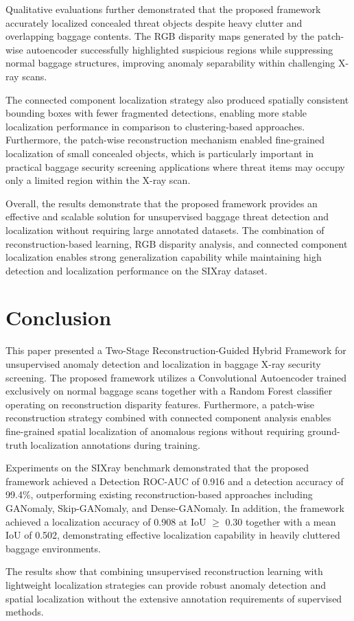 \documentclass{bmvc2k}
\begin{document}
Qualitative evaluations further demonstrated that the proposed framework accurately localized concealed threat objects despite heavy clutter and overlapping baggage contents. The RGB disparity maps generated by the patch-wise autoencoder successfully highlighted suspicious regions while suppressing normal baggage structures, improving anomaly separability within challenging X-ray scans.

The connected component localization strategy also produced spatially consistent bounding boxes with fewer fragmented detections, enabling more stable localization performance in comparison to clustering-based approaches. Furthermore, the patch-wise reconstruction mechanism enabled fine-grained localization of small concealed objects, which is particularly important in practical baggage security screening applications where threat items may occupy only a limited region within the X-ray scan.

Overall, the results demonstrate that the proposed framework provides an effective and scalable solution for unsupervised baggage threat detection and localization without requiring large annotated datasets. The combination of reconstruction-based learning, RGB disparity analysis, and connected component localization enables strong generalization capability while maintaining high detection and localization performance on the SIXray dataset.

\section{Conclusion}
\label{sec:conclusion}

This paper presented a Two-Stage Reconstruction-Guided Hybrid Framework for unsupervised anomaly detection and localization in baggage X-ray security screening. The proposed framework utilizes a Convolutional Autoencoder trained exclusively on normal baggage scans together with a Random Forest classifier operating on reconstruction disparity features. Furthermore, a patch-wise reconstruction strategy combined with connected component analysis enables fine-grained spatial localization of anomalous regions without requiring ground-truth localization annotations during training.

Experiments on the SIXray benchmark demonstrated that the proposed framework achieved a Detection ROC-AUC of 0.916 and a detection accuracy of 99.4\%, outperforming existing reconstruction-based approaches including GANomaly, Skip-GANomaly, and Dense-GANomaly. In addition, the framework achieved a localization accuracy of 0.908 at IoU $\geq$ 0.30 together with a mean IoU of 0.502, demonstrating effective localization capability in heavily cluttered baggage environments.

The results show that combining unsupervised reconstruction learning with lightweight localization strategies can provide robust anomaly detection and spatial localization without the extensive annotation requirements of supervised methods. 


\end{document}

